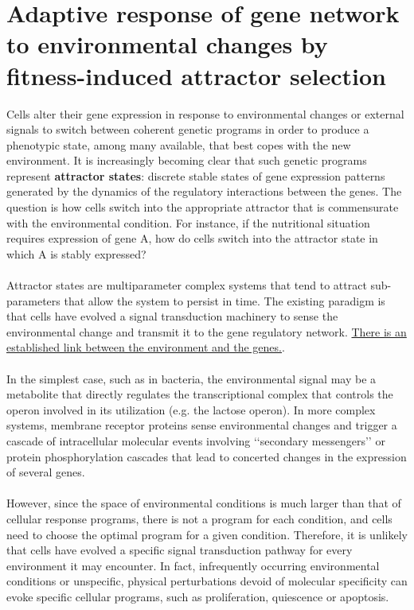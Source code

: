 \section{Adaptive response of gene network to environmental changes by fitness-induced attractor selection}
Cells alter their gene expression in response to environmental changes or external signals to switch between coherent genetic programs in order to produce a phenotypic state, among many available, that best copes with the new environment. It is increasingly becoming clear that such genetic programs represent \textbf{attractor states}: discrete stable states of gene expression patterns generated by the dynamics of the regulatory interactions between the genes. The question is how cells switch into the appropriate attractor that is commensurate with the environmental condition. For instance, if the nutritional situation requires expression of gene A, how do cells switch into the attractor state in which A is stably expressed? 
\\
\\
\noindent
Attractor states are multiparameter complex systems that tend to attract sub-parameters that allow the system to persist in time. The existing paradigm is that cells have evolved a signal transduction machinery to sense the environmental change and transmit it to the gene regulatory network. \underline{There is an established link between the environment and the genes.}. 
\\
\\
\noindent
In the simplest case, such as in bacteria, the environmental signal may be a metabolite that directly regulates the transcriptional complex that controls the operon involved in its utilization (e.g. the lactose operon). In more complex systems, membrane receptor proteins sense environmental changes and trigger a cascade of intracellular molecular events involving ‘‘secondary messengers’’ or protein phosphorylation cascades that lead to concerted changes in the expression of several genes. 
\\
\\
\noindent
However, since the space of environmental conditions is much larger than that of cellular response programs, there is not a program for each condition, and cells need to choose the optimal program for a given condition. Therefore, it is unlikely that cells have evolved a specific signal transduction pathway for every environment it may encounter. In fact, infrequently occurring environmental conditions or unspecific, physical perturbations devoid of molecular specificity can evoke specific cellular programs, such as proliferation, quiescence or apoptosis. 

